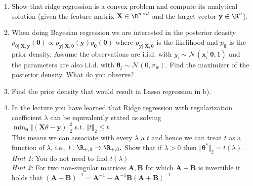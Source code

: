 \begin{enumerate}
\item Show that ridge regression is a convex problem and compute its analytical solution (given the feature matrix $\mathbf{X} \in \R^{n\times d}$ and the target vector $\mathbf{y} \in \R^n$).
\item When doing Bayesian regression we are interested in the posterior density $p_{\bm{\theta}|\;\mathbf{X}, \mathbf{y}}(\bm{\theta}) \propto p_{\mathbf{y}|\; \mathbf{X}, \bm{\theta}}(\mathbf{y}) p_{\bm{\theta}}(\bm{\theta})$ where $p_{\mathbf{y}|\; \mathbf{X}, \bm{\theta}}$ is the likelihood and $p_{\bm{\theta}}$ is the prior density. Assume the observations are i.i.d. with $y_i \sim \mathcal{N}(\mathbf{x}^\top_i\bm{\theta}, 1)$ and the parameters are also i.i.d. with $\bm{\theta}_j \sim \mathcal{N}(0, \sigma_w)$.
Find the maximizer of the posterior density. What do you observe?
\item Find the prior density that would result in Lasso regression in b).
\item In the lecture you have learned that Ridge regression with regularization coefficient $\lambda$ can be equivalently stated as solving \\
$\min_{\bm{\theta}} \Vert(\mathbf{X}\theta - \mathbf{y})\Vert^2_2$ s.t. $\Vert t\Vert_2\leq t.$ \\
This means we can associate with every $\lambda$ a $t$ and hence we can treat $t$ as a function of $\lambda$, i.e., $t:\R_{+,0} \rightarrow \R_{+,0}.$
Show that if $\lambda > 0$ then $\Vert\bm{\theta}^*\Vert_2 = t(\lambda).$ \\ \textit{Hint 1}: You do not need to find $t(\lambda)$ \\
\textit{Hint 2}: For two non-singular matrices $\mathbf{A}, \mathbf{B}$ for which $\mathbf{A} + \mathbf{B}$ is invertible it holds that $(\mathbf{A} + \mathbf{B})^{-1} = \mathbf{A}^{-1}  - \mathbf{A}^{-1}\mathbf{B}(\mathbf{A} + \mathbf{B})^{-1}$
\end{enumerate}
